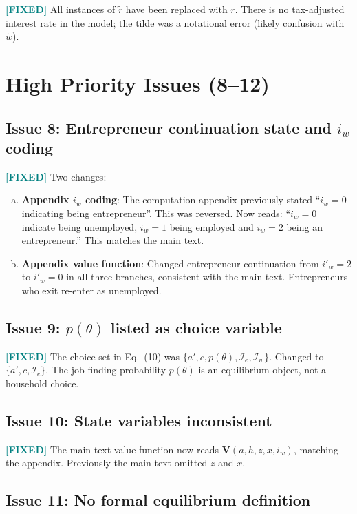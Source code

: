 \documentclass[11pt]{article}
\newcommand{\fixed}{\textcolor{teal}{\textbf{[FIXED]}}}
\begin{document}
\fixed{} All instances of $\tilde{r}$ have been replaced with $r$. There is no tax-adjusted interest rate in the model; the tilde was a notational error (likely confusion with $\widetilde{w}$).

\section*{High Priority Issues (8--12)}

\subsection*{Issue 8: Entrepreneur continuation state and $i_w$ coding}

\fixed{} Two changes:
\begin{enumerate}[(a)]
    \item \textbf{Appendix $i_w$ coding}: The computation appendix previously stated ``$i_w=0$ indicating being entrepreneur''. This was reversed. Now reads: ``$i_w=0$ indicate being unemployed, $i_w=1$ being employed and $i_w=2$ being an entrepreneur.'' This matches the main text.
    \item \textbf{Appendix value function}: Changed entrepreneur continuation from $i'_w=2$ to $i'_w=0$ in all three branches, consistent with the main text. Entrepreneurs who exit re-enter as unemployed.
\end{enumerate}

\subsection*{Issue 9: $p(\theta)$ listed as choice variable}

\fixed{} The choice set in Eq.~(10) was $\{a', c, p(\theta), \mathcal{I}_e, \mathcal{I}_w\}$. Changed to $\{a', c, \mathcal{I}_e\}$. The job-finding probability $p(\theta)$ is an equilibrium object, not a household choice.

\subsection*{Issue 10: State variables inconsistent}

\fixed{} The main text value function now reads $\mathbf{V}(a,h,z,x,i_w)$, matching the appendix. Previously the main text omitted $z$ and $x$.

\subsection*{Issue 11: No formal equilibrium definition}
\end{document}
